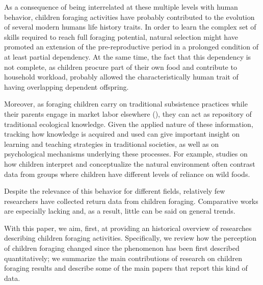 As a consequence of being interrelated at these multiple levels with human behavior, children foraging activities have probably contributed to the evolution of several modern humans life history traits. In order to learn the complex set of skills required to reach full foraging potential, natural selection might have promoted an extension of the pre-reproductive period in a prolonged condition of at least partial dependency.
At the same time, the fact that this dependency is not complete, as children procure part of their own food and contribute to household workload, probably allowed the characteristically human trait of having overlapping dependent offspring.

Moreover, as foraging children carry on traditional subsistence practices while their parents engage in market labor elsewhere (\cite{setalaphruk_children_2207}),
they can act as repository of traditional ecological knowledge.
Given the applied nature of these information, tracking how knowledge is acquired and used can give important insight on learning and teaching strategies in traditional societies, as well as on psychological mechanisms underlying these processes.
For example, studies on how children interpret and conceptualize the natural environment often contrast data from groups where children have different levels of reliance on wild foods.







Despite the relevance of this behavior for different fields, relatively few researchers have collected return data from children foraging. Comparative works are especially lacking and, as a result, little can be said on general trends. 



\vspace{0.5cm}
With this paper, we aim, first, at providing an historical overview of researches describing children foraging activities. 
Specifically, we review how the perception of children foraging changed since the phenomenon has been first described quantitatively; we summarize the main contributions of research on children foraging results and describe some of the main papers that report this kind of data.

